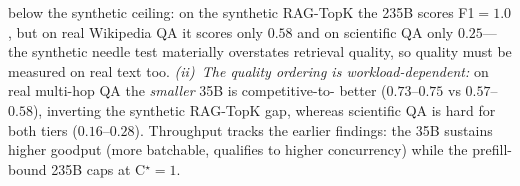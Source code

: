 \begin{table}[t]
{{  below the synthetic ceiling:} on the synthetic RAG-TopK the 235B scores F1$=1.0$,
  but on real Wikipedia QA it scores only $0.58$ and on scientific QA only
  $0.25$---the synthetic needle test materially overstates retrieval quality, so
  quality must be measured on real text too. \emph{(ii)~The quality ordering is
  workload-dependent:} on real multi-hop QA the \emph{smaller} 35B is competitive-to-
  better ($0.73$--$0.75$ vs $0.57$--$0.58$), inverting the synthetic RAG-TopK gap,
  whereas scientific QA is hard for both tiers ($0.16$--$0.28$). Throughput tracks
  the earlier findings: the 35B sustains higher goodput (more batchable, qualifies
  to higher concurrency) while the prefill-bound 235B caps at C$^\star{=}1$.}
  \label{tab:realqa}
\end{table}